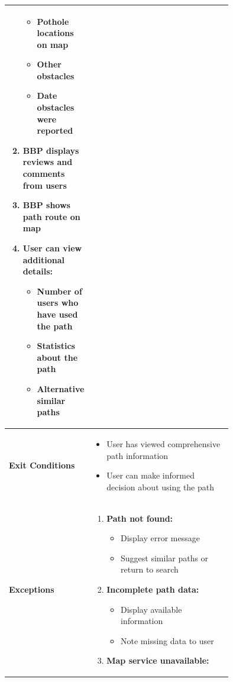 \begin{center}
\begin{longtable}{|l|p{0.75\linewidth}|}
\begin{enumerate}
            \begin{itemize}
                \item Pothole locations on map
                \item Other obstacles
                \item Date obstacles were reported
            \end{itemize}
            \item BBP displays reviews and comments from users
            \item BBP shows path route on map
            \item User can view additional details:
            \begin{itemize}
                \item Number of users who have used the path
                \item Statistics about the path
                \item Alternative similar paths
            \end{itemize}
        \end{enumerate} \\
        \hline
        \textbf{Exit Conditions}   & 
        \begin{itemize}
            \item User has viewed comprehensive path information
            \item User can make informed decision about using the path
        \end{itemize} \\
        \hline
        \textbf{Exceptions}       & 
        \begin{enumerate}
            \item \textbf{Path not found:}
            \begin{itemize}
                \item Display error message
                \item Suggest similar paths or return to search
            \end{itemize}
            \item \textbf{Incomplete path data:}
            \begin{itemize}
                \item Display available information
                \item Note missing data to user
            \end{itemize}
            \item \textbf{Map service unavailable:}

\end{enumerate}
\end{longtable}
\end{center}

